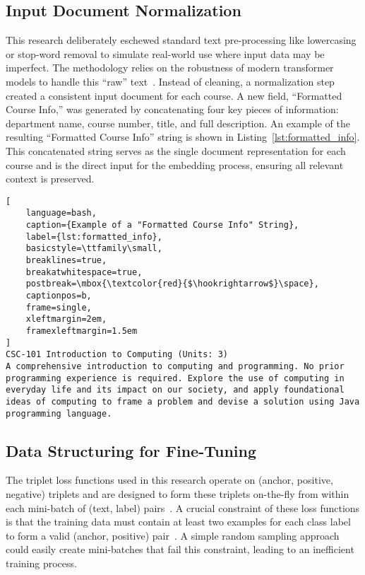 \subsection{Input Document Normalization}\label{ch:3.2.2}
This research deliberately eschewed standard text pre-processing like lowercasing or stop-word removal to simulate real-world use where input data may be imperfect. The methodology relies on the robustness of modern transformer models to handle this ``raw'' text~\cite{devlin2019bertpretrainingdeepbidirectional}. Instead of cleaning, a normalization step created a consistent input document for each course. A new field, ``Formatted Course Info,'' was generated by concatenating four key pieces of information: department name, course number, title, and full description.  An example of the resulting ``Formatted Course Info'' string is shown in Listing~\ref{lst:formatted_info}.  This concatenated string serves as the single document representation for each course and is the direct input for the embedding process, ensuring all relevant context is preserved.
\begin{lstlisting}[
    language=bash,
    caption={Example of a "Formatted Course Info" String},
    label={lst:formatted_info},
    basicstyle=\ttfamily\small,
    breaklines=true,
    breakatwhitespace=true,
    postbreak=\mbox{\textcolor{red}{$\hookrightarrow$}\space},
    captionpos=b,
    frame=single,
    xleftmargin=2em,
    framexleftmargin=1.5em
]
CSC-101 Introduction to Computing (Units: 3)
A comprehensive introduction to computing and programming. No prior programming experience is required. Explore the use of computing in everyday life and its impact on our society, and apply foundational ideas of computing to frame a problem and devise a solution using Java programming language.
\end{lstlisting}

\subsection{Data Structuring for Fine-Tuning}\label{ch:3.2.3}
The triplet loss functions used in this research operate on (anchor, positive, negative) triplets and are designed to form these triplets on-the-fly from within each mini-batch of (text, label) pairs~\cite{reimers-2019-sentence-bert,sbertLossOverview}. A crucial constraint of these loss functions is that the training data must contain at least two examples for each class label to form a valid (anchor, positive) pair~\cite{sbertLosses}. A simple random sampling approach could easily create mini-batches that fail this constraint, leading to an inefficient training process.

